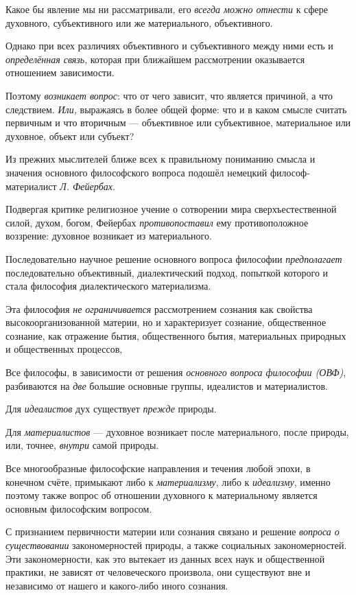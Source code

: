 \documentclass[a4paper,14pt,russian]{extreport}
\begin{document}
Какое бы явление мы ни рассматривали, его \emph{всегда можно отнести} к сфере духовного, субъективного или же материального, объективного.

Однако при всех различиях объективного и субъективного между ними есть и \emph{определённая связь}, которая при ближайшем рассмотрении оказывается отношением зависимости.

Поэтому \emph{возникает вопрос}: что от чего зависит, что является причиной, а что следствием. \emph{Или,} выражаясь в более общей форме: что и в каком смысле считать первичным и что вторичным --- объективное или субъективное, материальное или духовное, объект или субъект?

Из прежних мыслителей ближе всех к правильному пониманию смысла и значения основного философского вопроса подошёл немецкий философ-материалист \emph{Л. Фейербах}.

Подвергая критике религиозное учение о сотворении мира сверхъестественной силой, духом, богом, Фейербах \emph{противопоставил} ему противоположное воззрение: духовное возникает из материального.

Последовательно научное решение основного вопроса философии \emph{предполагает} последовательно объективный, диалектический подход, попыткой которого и стала философия диалектического материализма.

Эта философия \emph{не ограничивается} рассмотрением сознания как свойства высокоорганизованной материи, но и характеризует сознание, общественное сознание, как отражение бытия, общественного бытия, материальных природных и общественных процессов,

Все философы, в зависимости от решения \emph{основного вопроса философии (ОВФ)}, разбиваются на \emph{две} большие основные группы, идеалистов и материалистов.

Для \emph{идеалистов} дух существует \emph{прежде} природы.

Для \emph{материалистов} --- духовное возникает после материального, после природы, или, точнее, \emph{внутри} самой природы.

Все многообразные философские направления и течения любой эпохи, в конечном счёте, примыкают либо к \emph{материализму}, либо к \emph{идеализму}, именно поэтому также вопрос об отношении духовного к материальному является основным философским вопросом.

С признанием первичности материи или сознания связано и решение \emph{вопроса о существовании} закономерностей природы, а также социальных закономерностей. Эти закономерности, как это вытекает из данных всех наук и общественной практики, не зависят от человеческого произвола, они существуют вне и независимо от нашего и какого-либо иного сознания.
\end{document}
